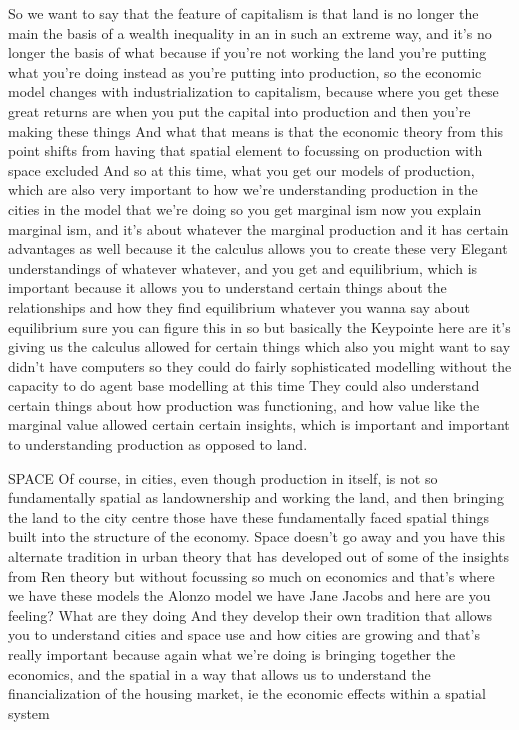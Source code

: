 \documentclass[]{article}
\begin{document}
So we want to say that the feature of capitalism is that land is no longer the main the basis of a wealth inequality in an in such an extreme way, and it’s no longer the basis of what because if you’re not working the land you’re putting what you’re doing instead as you’re putting into production, so the economic model changes with industrialization to capitalism, because where you get these great returns are when you put the capital into production and then you’re making these things
And what that means is that the economic theory from this point shifts from having that spatial element to focussing on production with space excluded
And so at this time, what you get our models of production, which are also very important to how we’re understanding production in the cities in the model that we’re doing so you get marginal ism now you explain marginal ism, and it’s about whatever the marginal production and it has certain advantages as well because it the calculus allows you to create these very Elegant understandings of whatever whatever, and you get and equilibrium, which is important because it allows you to understand certain things about the relationships and how they find equilibrium whatever you wanna say about equilibrium sure you can figure this in so but basically the Keypointe here are it’s giving us the calculus allowed for certain things which also you might want to say didn’t have computers so they could do fairly sophisticated modelling without the capacity to do agent base modelling at this time They could also understand certain things about how production was functioning, and how value like the marginal value allowed certain certain insights, which is important and important to understanding production as opposed to land.

SPACE
Of course, in cities, even though production in itself, is not so fundamentally spatial as landownership and working the land, and then bringing the land to the city centre those have these fundamentally faced spatial things built into the structure of the economy. Space doesn’t go away and you have this alternate tradition in urban theory that has developed out of some of the insights from Ren theory but without focussing so much on economics and that’s where we have these models the Alonzo model we have Jane Jacobs and here are you feeling? What are they doing And they develop their own tradition that allows you to understand cities and space use and how cities are growing and that’s really important because again what we’re doing is bringing together the economics, and the spatial in a way that allows us to understand the financialization of the housing market, ie the economic effects within a spatial system
\end{document}
